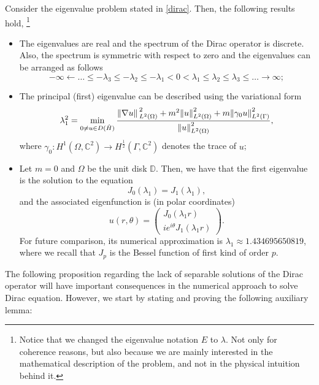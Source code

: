 \begin{proposition}\label{dirac_properties}
    Consider the eigenvalue problem stated in \eqref{dirac}. Then, the following results hold, \footnote{Notice that we changed the eigenvalue notation \(E\) to \(\lambda\). Not only for coherence reasons, but also because we are mainly interested in the mathematical description of the problem, and not in the physical intuition behind it.}
    \begin{itemize}
        \item The eigenvalues are real and the spectrum of the Dirac operator is discrete. Also, the spectrum is symmetric with respect to zero and the eigenvalues can be arranged as follows
        \[
        -\infty \leftarrow \dots \leq -\lambda_3 \leq -\lambda_2 \leq -\lambda_1 < 0 < \lambda_1 \leq \lambda_2 \leq \lambda_3 \leq \dots \rightarrow \infty;
        \]
        \item The principal (first) eigenvalue can be described using the variational form
        \[
        \lambda_1^2 = \min_{0 \neq u \in D(\hat{H})}\frac{\norm*{\nabla u}_{L^2(\Omega)}^2 + m^2 \norm{u}_{L^2(\Omega)}^2 + m \norm{\gamma_0 u}_{L^2(\Gamma)}^2}{\norm{u}_{L^2(\Omega)}^2},
        \]
        where \(\gamma_0: H^1(\Omega, \mathbb{C}^2) \rightarrow H^{\frac{1}{2}}(\Gamma, \mathbb{C}^2)\) denotes the trace of \(u\);
        \item Let \(m=0\) and \(\Omega\) be the unit disk \(\mathbb{D}\). Then, we have that the first eigenvalue is the solution to the equation
        \[
        J_0(\lambda_1) = J_1(\lambda_1),
        \]
        and the associated eigenfunction is (in polar coordinates)
        \[
        u(r, \theta) = \begin{pmatrix}
            J_0(\lambda_1 r)\\
            i e^{i \theta}J_1(\lambda_1 r)
        \end{pmatrix}.    
        \]
        For future comparison, its numerical approximation is \(\lambda_1 \approx 1.434695650819\), where we recall that \(J_p\) is the Bessel function of first kind of order \(p\).
    \end{itemize}
\end{proposition}

The following proposition regarding the lack of separable solutions of the Dirac operator will have important consequences in the numerical approach to solve Dirac equation. However, we start by stating and proving the following auxiliary lemma:

